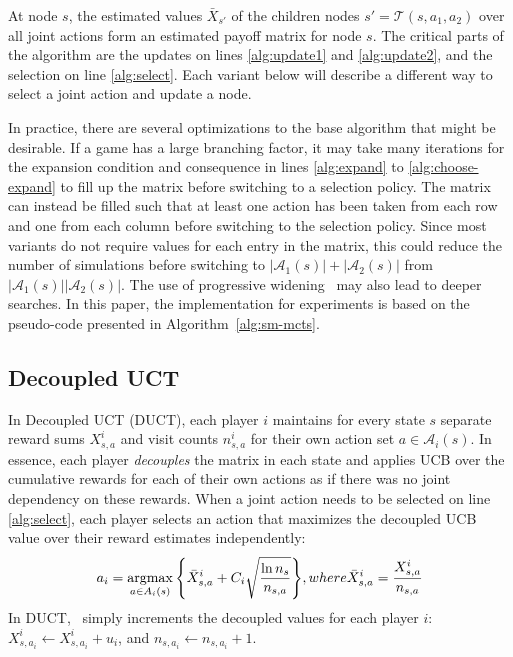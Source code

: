 \documentclass[conference]{IEEEtran}
\newcommand{\argmax}{\operatornamewithlimits{argmax}}
\newcommand{\cA}{\mathcal{A}}
\newcommand{\cT}{\mathcal{T}}
\begin{document}
At node $s$, the estimated values $\bar{X}_{s'}$ of the children nodes $s' = \cT(s,a_1,a_2)$ over all 
joint actions form an estimated payoff matrix for node $s$. 
The critical parts of the algorithm are the updates on lines \ref{alg:update1} and \ref{alg:update2}, and the selection 
on line \ref{alg:select}. Each variant below will describe a different way to select a joint action and update a node. 

In practice, there are several optimizations to the base algorithm that might be desirable.
If a game has a large branching factor, it may take many iterations for 
the expansion condition and consequence in lines \ref{alg:expand} to \ref{alg:choose-expand} to fill up the matrix before 
switching to a selection policy. 
The matrix can instead be filled such that at least one action has been taken from each row and one from each column before 
switching to the selection policy. 
Since most variants do not require values for each entry in the matrix, this could reduce the number of simulations before 
switching to $|\cA_1(s)| + |\cA_2(s)|$ from $|\cA_1(s)||\cA_2(s)|$. The use of progressive 
widening~\cite{Chaslot08Progressive} may also lead to deeper searches. 
In this paper, the implementation for experiments is based on the pseudo-code presented in Algorithm~\ref{alg:sm-mcts}.

\subsection{Decoupled UCT} 

In Decoupled UCT (DUCT), each player $i$ maintains for every state $s$ separate reward sums $X^i_{s,a}$ and 
visit counts $n^i_{s,a}$ for their own action set $a \in \cA_i(s)$. 
In essence, each player {\it decouples} the matrix in each state and applies UCB over the cumulative rewards for 
each of their own actions as if there was no joint dependency on these rewards.
When a joint action needs to be selected on line 
\ref{alg:select}, each player selects an action that maximizes the decoupled UCB value over their reward estimates 
independently:
\begin{equation}
\label{eq:duct}
a_i = \argmax_{a \in A_i(s)}{ \left\{ \bar{X}^i_{s,a} + C_i \sqrt{\frac{\ln n_s}{n_{s,a}}} \right\} }, 
  \mbox{ where } \bar{X}^i_{s,a} = \frac{X^i_{s,a}}{n_{s,a}}
\end{equation}
\noindent In DUCT, \Update~simply increments the decoupled values for each player $i$: $X^i_{s,a_i} \leftarrow X^i_{s,a_i} + u_i$,
and $n_{s,a_i} \leftarrow n_{s,a_i} + 1$. 
\end{document}
